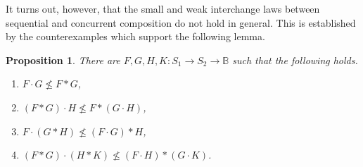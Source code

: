 \documentclass[12pt]{article}
\newtheorem{proposition}{Proposition}
\theoremstyle{definition}
\begin{document}
It turns out, however, that the small and weak interchange laws
between sequential and concurrent composition do not hold in
general. This is established by the counterexamples which support the
following lemma.
\begin{proposition}
  There are $F,G,H,K:S_1\to S_2\to \mathbb{B}$ such that the following
  holds.
  \begin{enumerate}\label{prop:interchangeref}
  \item $F\cdot G\not\le F\ast G$,
  \item $(F\ast G)\cdot H\not\le F\ast (G\cdot H)$,
  \item $F\cdot (G\ast H)\not\le (F\cdot G)\ast H$,
  \item $(F\ast G)\cdot (H\ast K)\not\le (F\cdot H)\ast (G\cdot K)$.
  \end{enumerate}
\end{proposition}
\end{document}
